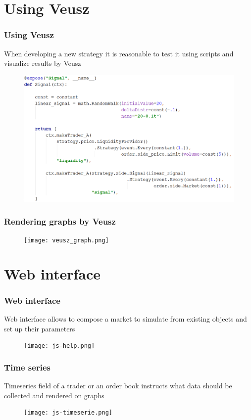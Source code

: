 \documentclass{beamer}
\begin{document}
\section{Using Veusz}
\begin{frame}
\frametitle{Using Veusz}
When developing a new strategy it is reasonable to test it using scripts and visualize results by Veusz
\begin{figure}[htbp]
\centering
\includegraphics[width=1\linewidth]{using_veusz_code.png}
\end{figure}
\end{frame}

\begin{frame}
\frametitle{Rendering graphs by Veusz}
\begin{figure}[htbp]
\centering
\texttt{[image: veusz\_graph.png]}
\end{figure}
\end{frame}


\section{Web interface}
\begin{frame}
\frametitle{Web interface}
Web interface allows to compose a market to simulate from existing objects and set up their parameters
\begin{figure}[htbp]
\centering
\texttt{[image: js-help.png]}
\end{figure}
\end{frame}

\begin{frame}
\frametitle{Time series}
Timeseries field of a trader or an order book instructs what data should be collected and rendered on graphs
\begin{figure}[htbp]
\centering
\texttt{[image: js-timeserie.png]}
\end{figure}
\end{frame}
\end{document}
